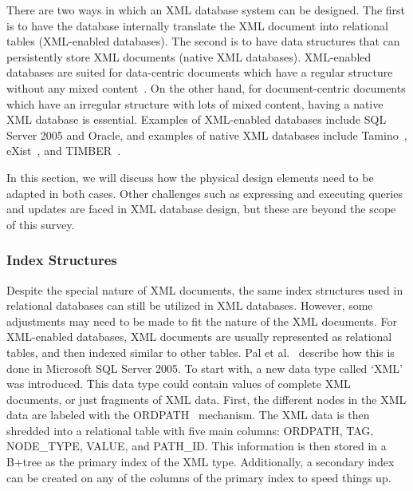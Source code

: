 \documentclass[12pt,a4paper]{article}
\begin{document}
There are two ways in which an XML database system can be designed. The first is to have the database internally translate the XML document into relational
tables (XML-enabled databases). The second is to have data structures that can persistently store XML documents (native XML databases). XML-enabled databases
are suited for data-centric documents which have a regular structure without any mixed content~\cite{bourret2003xml}. On the other hand, for document-centric
documents which have an irregular structure with lots of mixed content, having a native XML database is essential. Examples of XML-enabled databases include SQL
Server 2005 and Oracle, and examples of native XML databases include Tamino~\cite{taminodb},
eXist~\cite{meier2009exist}, and TIMBER~\cite{jagadish2002timber}.

In this section, we will discuss how the physical design elements need to be adapted in both cases. Other challenges such as expressing and executing queries
and updates are faced in XML database design, but these are beyond the scope of this survey.



\subsubsection{Index Structures}

Despite the special nature of XML documents, the same index structures used in relational databases can still be utilized in XML databases. However, some
adjustments may need to be made to fit the nature of the XML documents. For XML-enabled databases, XML documents are usually represented as relational tables,
and then indexed similar to other tables. Pal et al.~\cite{pal2004indexing} describe how this is done in Microsoft SQL Server 2005. To start with, a new data
type called `XML' was introduced. This data type could contain values of complete XML documents, or just fragments of XML data. First, the different nodes in
the XML data are labeled with the ORDPATH~\cite{o2004ordpaths} mechanism. The XML data is then shredded into a relational table with five main columns: ORDPATH,
TAG, NODE\_TYPE, VALUE, and PATH\_ID. This information is then stored in a B+tree as the primary index of the XML type. Additionally, a secondary index
can be created on any of the columns of the primary index to speed things up.
\end{document}
